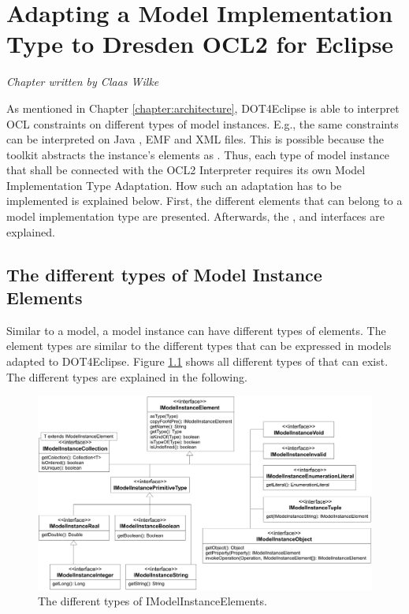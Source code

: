 \chapter{Adapting a Model Implementation Type to Dresden OCL2 for Eclipse}
\label{chapter:modelInstanceTypeAdaptation}

\begin{flushright}
\textit{Chapter written by Claas Wilke}
\end{flushright}

As mentioned in Chapter \ref{chapter:architecture}, \acl{DOT4Eclipse} is able to interpret \acs{OCL} constraints on different types of model instances. E.g., the same constraints can be interpreted on Java , \acs{EMF}  and \acs{XML} files. This is possible because the toolkit abstracts the instance's elements as . Thus, each type of model instance that shall be connected with the \acs{OCL}2 Interpreter requires its own Model Implementation Type Adaptation. How such an adaptation has to be implemented is explained below. First, the different elements that can belong to a model implementation type are presented. Afterwards, the ,  and  interfaces are explained.


\section{The different types of Model Instance Elements}

Similar to a model, a model instance can have different types of elements. The element types are similar to the different types that can be expressed in models adapted to \acl{DOT4Eclipse}. Figure \ref{pic:modelInstanceTypeAdaptation:typeHierarchy} shows all different types of  that can exist. The different types are explained in the following.

\begin{figure}
	\centering
	\includegraphics[width=1.0\linewidth]{figures/modelInstanceTypeAdaptation/typeHierarchy}
	\caption{The different types of IModelInstanceElements.}
	\label{pic:modelInstanceTypeAdaptation:typeHierarchy}
\end{figure}


